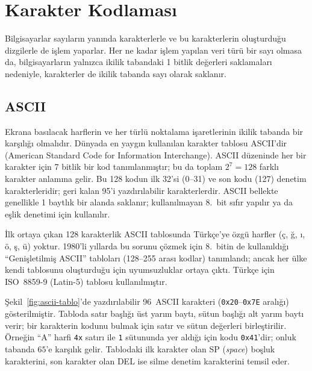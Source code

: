 \section{Karakter Kodlaması}
\label{sec:karakter-kodlama}

Bilgisayarlar sayıların yanında karakterlerle ve bu karakterlerin oluşturduğu dizgilerle de işlem yaparlar. Her ne kadar işlem yapılan veri türü bir sayı olmasa da, bilgisayarların yalnızca ikilik tabandaki 1 bitlik değerleri saklamaları nedeniyle, karakterler de ikilik tabanda sayı olarak saklanır.

\subsection{ASCII}
\label{sec:ascii}

Ekrana basılacak harflerin ve her türlü noktalama işaretlerinin ikilik tabanda bir karşılığı olmalıdır. Dünyada en yaygın kullanılan karakter tablosu ASCII'dir (American Standard Code for Information Interchange). ASCII düzeninde her bir karakter için 7 bitlik bir kod tanımlanmıştır; bu da toplam $2^7 = 128$ farklı karakter anlamına gelir. Bu 128 kodun ilk 32'si (0--31) ve son kodu (127) denetim karakterleridir; geri kalan 95'i yazdırılabilir karakterlerdir. ASCII bellekte genellikle 1 baytlık bir alanda saklanır; kullanılmayan 8.~bit sıfır yapılır ya da eşlik denetimi için kullanılır.

İlk ortaya çıkan 128 karakterlik ASCII tablosunda Türkçe'ye özgü harfler (ç, ğ, ı, ö, ş, ü) yoktur. 1980'li yıllarda bu sorunu çözmek için 8.~bitin de kullanıldığı ``Genişletilmiş ASCII'' tabloları (128--255 arası kodlar) tanımlandı; ancak her ülke kendi tablosunu oluşturduğu için uyumsuzluklar ortaya çıktı. Türkçe için ISO~8859-9 (Latin-5) tablosu kullanılmıştır.

Şekil~\ref{fig:ascii-tablo}'de yazdırılabilir 96~ASCII karakteri (\texttt{0x20}--\texttt{0x7E} aralığı) gösterilmiştir. Tabloda satır başlığı üst yarım baytı, sütun başlığı alt yarım baytı verir; bir karakterin kodunu bulmak için satır ve sütun değerleri birleştirilir. Örneğin ``A'' harfi \texttt{4x} satırı ile \texttt{1} sütununda yer aldığı için kodu \texttt{0x41}'dir; onluk tabanda $65$'e karşılık gelir. Tablodaki ilk karakter olan SP (\textit{space}) boşluk karakterini, son karakter olan DEL ise silme denetim karakterini temsil eder.

